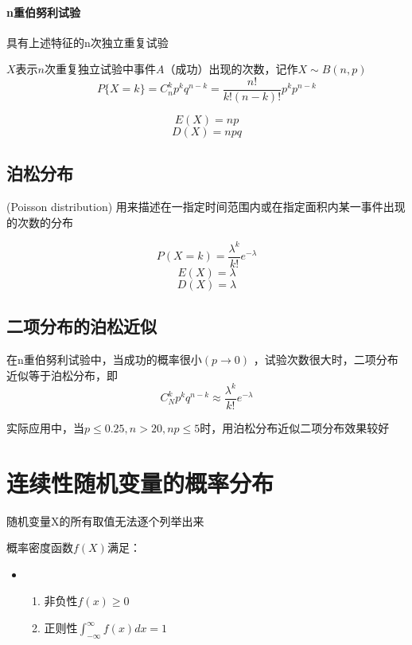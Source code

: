 \documentclass[UTF8,10pt]{book}
\begin{document}
            \paragraph{n重伯努利试验} 具有上述特征的n次独立重复试验

            $X$表示$n$次重复独立试验中事件$A$（成功）出现的次数，记作$X \sim B(n,p)$
            $$ P\{X=k\} = C_n^k p^k q^{n-k} = \frac{n!}{k!(n-k)!} p^k p^{n-k}$$

            $$ E(X) = np $$
            $$ D(X) = npq $$

        \subsection{泊松分布}
            (Poisson distribution)
            {\kaishu 用来描述在一指定时间范围内或在指定面积内某一事件出现的次数的分布}
            
            $$ P(X=k) = \frac{\lambda^k }{k!} e^{-\lambda}$$
            $$ E(X) = \lambda $$
            $$ D(X) = \lambda $$

        \subsection{二项分布的泊松近似}
            在n重伯努利试验中，当成功的概率很小$ (p\to 0)$ ，试验次数很大时，二项分布近似等于泊松分布，即
            $$ C_N^k p^k q^{n-k}  \approx   \frac{\lambda^k }{k!} e^{-\lambda}$$

            实际应用中，当$p\le 0.25 , n>20 ,np \le 5$时，用泊松分布近似二项分布效果较好




    \section{连续性随机变量的概率分布}
                {\kaishu 随机变量X的所有取值无法逐个列举出来}

                概率密度函数$f(X)$满足：
                \begin{itemize}
                    \item [] {
                        \begin{enumerate}
                            \item 非负性$ f(x) \ge 0 $
                            \item 正则性$ \int_{-\infty}^\infty f(x) dx = 1 $
                        \end{enumerate}
                    }
                \end{itemize}
				
\end{document}
